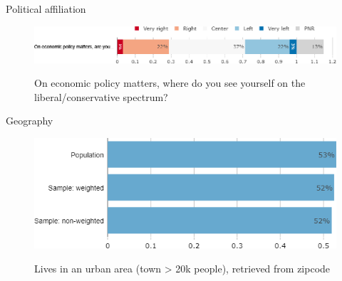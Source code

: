 \documentclass[aspectratio=169,9pt,dvipsnames]{beamer}
\begin{document}

\begin{frame}{Political affiliation}%
\begin{figure}[h!]
\centering
\caption{On economic policy matters, where do you see yourself on the liberal/conservative spectrum?}
\includegraphics[width=\textwidth]{../figures/DK/left_right_DK.png} \\
\end{figure}
\end{frame}

\begin{frame}{Geography}%
\begin{figure}[h!]
\centering
\caption{Lives in an urban area (town > 20k people), retrieved from zipcode}
\includegraphics[width=.5\textwidth]{../figures/DK/urban_DK_comp.png} \\
\vspace{.2cm}
\end{figure}
\end{frame}
\end{document}
